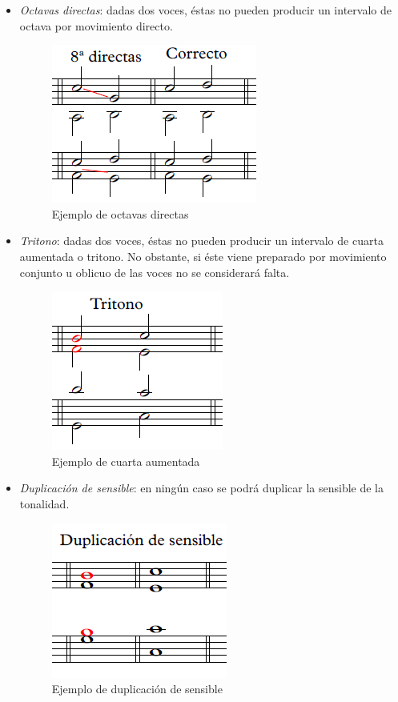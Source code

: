 \begin{itemize}
	\item \textit{Octavas directas}: dadas dos voces, éstas no pueden producir un intervalo de octava por movimiento directo.

	\begin{figure}[H]
		\centering
		\includegraphics[scale=0.7]{imagenes/8directas.png}
		\caption{Ejemplo de octavas directas}
		\label{fig2.1.4}
	\end{figure}

	\item \textit{Tritono}: dadas dos voces, éstas no pueden producir un intervalo de cuarta aumentada o tritono. No obstante, si éste viene preparado por movimiento conjunto u oblicuo de las voces no se considerará falta.

	\begin{figure}[H]
		\centering
		\includegraphics[scale=0.7]{imagenes/tritono.png}
		\caption{Ejemplo de cuarta aumentada}
		\label{fig2.1.5}
	\end{figure}

	\item \textit{Duplicación de sensible}: en ningún caso se podrá duplicar la sensible de la tonalidad. 

	\begin{figure}[H]
		\centering
		\includegraphics[scale=0.7]{imagenes/sensibledup.png}
		\caption{Ejemplo de duplicación de sensible}
		\label{fig2.1.6}
	\end{figure}


\end{itemize}
